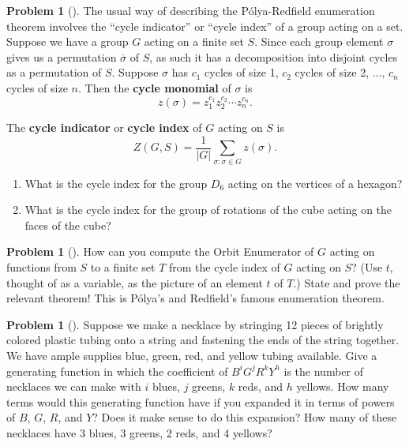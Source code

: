 \documentclass[10pt,]{book}
\newcommand{\terminology}[1]{\textbf{#1}}
\theoremstyle{plain}
\theoremstyle{definition}
\newtheorem{activity}[project]{Problem}
\theoremstyle{definition}
\numberwithin{equation}{chapter}
\newcommand{\importantarrow}{\Rightarrow}
\begin{document}
\begin{activity}[] \label{activity-320}
\hypertarget{p-1773}{}%
The usual way of describing the Pólya-Redfield enumeration theorem involves the ``cycle indicator'' or ``cycle index'' of a group acting on a set. Suppose we have a group \(G\) acting on a finite set \(S\). Since each group element \(\sigma\) gives us a permutation \(\overline{\sigma}\) of \(S\), as such it has a decomposition into disjoint cycles as a permutation of \(S\). Suppose \(\sigma\) has \(c_1\) cycles of size 1, \(c_2\) cycles of size 2, ..., \(c_n\) cycles of size \(n\). Then the \terminology{cycle monomial} of \(\sigma\) is%
\begin{equation*}
z(\sigma) = z_1^{c_1}z_2^{c_2}\cdots z_n^{c_n}.
\end{equation*}
%
\par
\hypertarget{p-1774}{}%
The \terminology{cycle indicator} or \terminology{cycle index} of \(G\) acting on \(S\) is%
\begin{equation*}
Z(G,S) = \frac{1}{|G|}\sum_{\sigma: \sigma \in G} z(\sigma).
\end{equation*}
%
\begin{enumerate}[font=\bfseries,label=(\alph*),ref=\alph*]
\item\label{task-233} \marginsymbol[-2.5em]{} \hypertarget{p-1775}{}%
What is the cycle index for the group \(D_6\) acting on the vertices of a hexagon?%
\item\label{task-234} \marginsymbol[-2.5em]{} \hypertarget{p-1777}{}%
What is the cycle index for the group of rotations of the cube acting on the faces of the cube?%
\end{enumerate}
\end{activity}
\begin{activity}[]\marginsymbol[-1em]{} \label{activity-321}
\hypertarget{p-1779}{}%
How can you compute the Orbit Enumerator of \(G\) acting on functions
from \(S\) to a finite set \(T\) from the cycle index of \(G\) acting
on \(S\)? (Use \(t\), thought of as a variable, as the picture of an
element \(t\) of \(T\).) State and prove the relevant theorem! This is
Pólya's and Redfield's famous enumeration
theorem.%
\end{activity}
\begin{activity}[]\marginsymbol[-1em]{\pdftooltip{$\importantarrow$}{especially interesting}} \label{activity-322}
\hypertarget{p-1781}{}%
Suppose we make a necklace by stringing 12 pieces of brightly colored plastic tubing onto a string and fastening the ends of the string together. We have ample supplies blue, green, red, and yellow tubing available. Give a generating function in which the coefficient of \(B^iG^jR^kY^h\) is the number of necklaces we can make with \(i\) blues, \(j\) greens, \(k\) reds, and \(h\) yellows. How many terms would this generating function have if you expanded it in terms of powers of \(B\), \(G\), \(R\), and \(Y\)? Does it make sense to do this expansion? How many of these necklaces have 3 blues, 3 greens, 2 reds, and 4 yellows?%
\end{activity}
\end{document}
